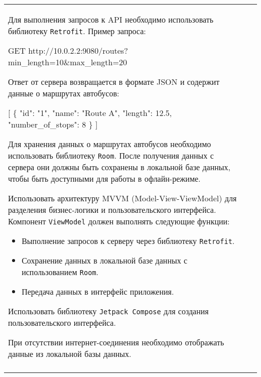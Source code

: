 \documentclass[a4paper]{article}
\begin{document}
\begin{tabular}{!{\vrule width 2pt}p{5cm}|p{6cm}|p{4cm}!{\vrule width 2pt}}
{\begin{minipage}{16cm}
\begin{enumerate}

Для выполнения запросов к API необходимо использовать библиотеку \texttt{Retrofit}. Пример запроса:


GET http://10.0.2.2:9080/routes?min\_length=10\&max\_length=20


Ответ от сервера возвращается в формате JSON и содержит данные о маршрутах автобусов:


[
  \{
    "id": "1",
    "name": "Route A",
    "length": 12.5,
    "number\_of\_stops": 8
  \}
]


Для хранения данных о маршрутах автобусов необходимо использовать библиотеку \texttt{Room}. После получения данных с сервера они должны быть сохранены в локальной базе данных, чтобы быть доступными для работы в офлайн-режиме.

Использовать архитектуру MVVM (Model-View-ViewModel) для разделения бизнес-логики и пользовательского интерфейса. Компонент \texttt{ViewModel} должен выполнять следующие функции:
\begin{itemize}
    \item Выполнение запросов к серверу через библиотеку \texttt{Retrofit}.
    \item Сохранение данных в локальной базе данных с использованием \texttt{Room}.
    \item Передача данных в интерфейс приложения.
\end{itemize}

Использовать библиотеку \texttt{Jetpack Compose} для создания пользовательского интерфейса.

При отсутствии интернет-соединения необходимо отображать данные из локальной базы данных. 
\end{enumerate}

\vspace{0.2cm}
    
\end{minipage}
}
\\
\end{tabular}
\end{document}
